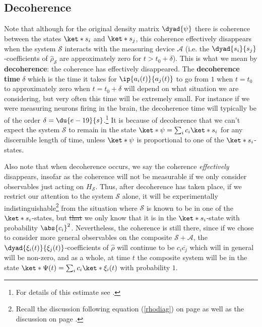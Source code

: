 \documentclass[12pt]{report}
\providecommand{\DIFadd}[1]{{\protect\color{blue}\uwave{#1}}} %
\providecommand{\DIFdel}[1]{{\protect\color{red}\sout{#1}}}                      %
\providecommand{\DIFaddbegin}{} %
\providecommand{\DIFaddend}{} %
\providecommand{\DIFdelbegin}{} %
\providecommand{\DIFdelend}{} %
\begin{document}
    \subsection{Decoherence}
    Note that although for the original density matrix $\dyad{\psi}$ there is coherence between the states $\ket*{s_i}$ and $\ket*{s_j}$, this coherence effectively  disappears when the system $\mathcal{S}$ interacts with the measuring device $\mathcal{A}$ (i.e. the $\dyad{s_i}{s_j}$-coefficients of $\hat{\rho}_\mathcal{S}$ are approximately zero for $t> t_0+\delta$). This is what we mean by \textbf{decoherence}: the coherence has effectively disappeared. The \textbf{decoherence time} $\delta$ which is the time it takes for $\ip{a_i(t)}{a_j(t)}$ to go from $1$ when $t=t_0$ to approximately zero when $t=t_0+\delta$ will depend on what situation we are considering, but very often this time will be extremely small. For instance if we were measuring neurons firing in the brain, the decoherence time will typically be of the order $\delta =\du{e-19}{s}$.\footnote{For details of this estimate see \cite[370]{Schlosshauer}.} It is because of decoherence that we can't expect the system $\mathcal{S}$ to remain in the state $\ket*{\psi}=\sum_i c_i\ket*{s_i}$ for any discernible length of time, unless $\ket*{\psi}$ is proportional to one of the $\ket*{s_i}$-states.  

    Also note that when decoherence occurs, we say the coherence \emph{effectively} disappears, insofar as the coherence will not be measurable if we only consider observables just acting on $H_\mathcal{S}$. Thus, after decoherence has taken place, if we restrict our attention to the system $\mathcal{S}$ alone, it will be experimentally indistinguishable\footnote{Recall the discussion following equation (\ref{rhodiag}) on page \pageref{rhodiag} as well as the discussion on page \pageref{subtle}.} from the situation where $\mathcal{S}$ is known to be in one of the $\ket*{s_i}$-states, but \DIFdelbegin \DIFdel{that }\DIFdelend \DIFaddbegin \DIFadd{where }\DIFaddend we only know that it is in the $\ket*{s_i}$-state with probability $\abs{c_i}^2$. Nevertheless, the coherence is still there, since if we chose to consider more general observables on the composite $\mathcal{S}+\mathcal{A}$, the $\dyad{\xi_i(t)}{\xi_j(t)}$-coefficients of $\hat{\rho}$ will continue to be $c_i\overline{c_j}$ which will in general will be non-zero, and as a whole, at time $t$ the composite system will be in the state $\ket*{\Psi(t)}=\sum_i c_i\ket*{\xi_i(t)}$ with probability $1$.
\end{document}
